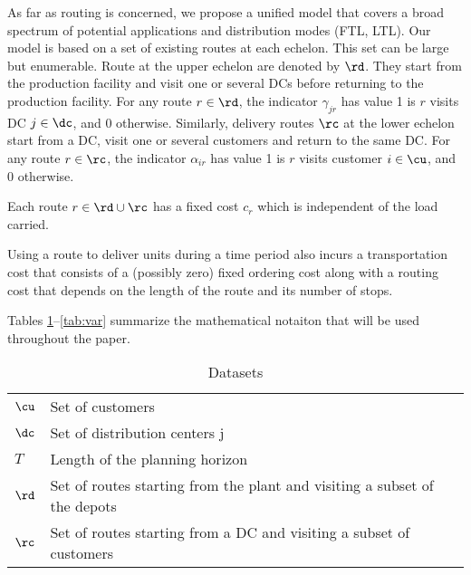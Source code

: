 \documentclass[a4paper,10pt]{article}
\begin{document}
\begin{linenumbers}
As far as routing is concerned, we propose a unified model that covers a broad spectrum of potential applications and distribution modes (FTL, LTL). 
Our model is based on a set of existing routes at each echelon. 
This set can be large but enumerable. 
Route at the upper echelon are denoted by $\rd$. 
They start from the production facility and visit one or several DCs before returning to the production facility. 
For any route $r \in \rd$, the indicator $\gamma_{jr}$ has value 1 is $r$ visits DC $j \in \dc$, and 0 otherwise. 
Similarly, delivery routes $\rc$ at the lower echelon start from a DC, visit one or several customers and return to the same DC. 
For any route $r \in \rc$, the indicator $\alpha_{ir}$ has value 1 is $r$ visits customer $i \in \cu$, and 0 otherwise. 

Each route 	$r\in \rd\cup\rc$ has a fixed cost 	$c_r$ which is independent of the load carried. 





Using a route to deliver units during a time period also incurs a transportation cost that consists of a (possibly zero) fixed ordering cost along with a routing cost that depends on the length of the route and its number of stops.



Tables \ref{tab:set}--\ref{tab:var} summarize the mathematical notaiton that will be used throughout the paper.

\begin{table}[htbp]
    \centering
    \begin{tabular}{ll}
        \toprule
        $\cu$ & Set of customers \\ 
        $\dc$ & Set of distribution centers j \\
         $T$ & Length of the planning horizon\\
        $\rd$ & Set of routes starting from the plant and visiting a subset of the depots\\
        $\rc$ & Set of routes starting from a DC and visiting a subset of customers\\
        \bottomrule
    \end{tabular}
 \caption{Datasets}
   \label{tab:set}
\end{table}


\end{linenumbers}
\end{document}
